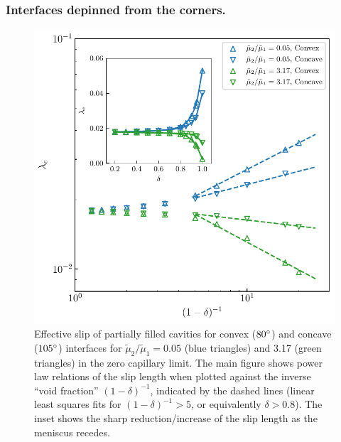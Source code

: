 \subsubsection{Interfaces depinned from the corners.}


\begin{figure}[t]
 \begin{center}
 \includegraphics[width=.8\columnwidth]{filling3.pdf}
 \end{center}
 \caption{Effective slip of partially filled cavities for convex ($80\degree$) and concave ($105\degree$) interfaces for $\tilde{\mu}_2/\tilde{\mu}_1=0.05$ (blue triangles) and 3.17 (green triangles) in the zero capillary limit. The main figure shows power law relations of the slip length when plotted against the inverse ``void fraction'' $(1-\delta)^{-1}$, indicated by the dashed lines (linear least squares fits for $(1-\delta)^{-1}>5$, or equivalently $\delta > 0.8$). The inset shows the sharp reduction/increase of the slip length as the meniscus recedes.}
 \label{fig: slip-height}
\end{figure}

